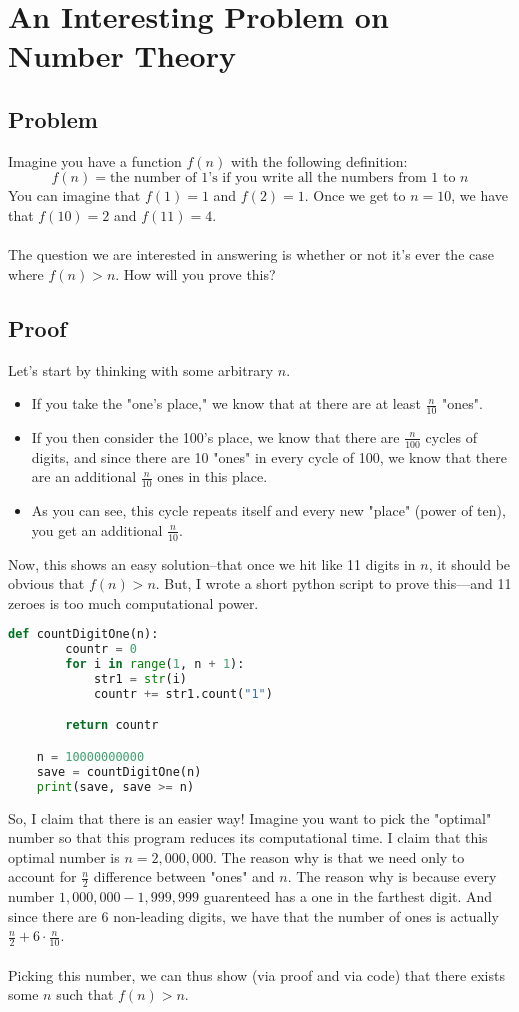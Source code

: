 \section{An Interesting Problem on Number Theory}
\subsection{Problem}

Imagine you have a function $f(n)$ with the following definition:
$$
f(n) = \text{the number of $1$'s if you write all the numbers from $1$ to $n$}
$$
You can imagine that $f(1) = 1$ and $f(2) = 1$. Once we get to $n = 10$, we have that $f(10) = 2$ and $f(11) = 4$. \\
\\
The question we are interested in answering is whether or not it's ever the case where $f(n) > n$. How will you prove this?

\subsection{Proof}
Let's start by thinking with some arbitrary $n$. 
\begin{itemize}
\item If you take the "one's place," we know that at there are at least $\frac{n}{10}$ "ones". 
\item If you then consider the 100's place, we know that there are $\frac{n}{100}$ cycles of digits, and since there are 10 "ones" in every cycle of 100, we know that there are an additional $\frac{n}{10}$ ones in this place.
\item As you can see, this cycle repeats itself and every new "place" (power of ten), you get an additional $\frac{n}{10}$. 
\end{itemize}
Now, this shows an easy solution--that once we hit like 11 digits in $n$, it should be obvious that $f(n) > n$. But, I wrote a short python script to prove this---and 11 zeroes is too much computational power. 

\begin{lstlisting}[language=Python]
	def countDigitOne(n):
		countr = 0
		for i in range(1, n + 1):
			str1 = str(i)
			countr += str1.count("1")

		return countr

	n = 10000000000
	save = countDigitOne(n)
	print(save, save >= n)
\end{lstlisting}

So, I claim that there is an easier way! Imagine you want to pick the "optimal" number so that this program reduces its computational time. I claim that this optimal number is $n = 2,000,000$. The reason why is that we need only to account for $\frac{n}{2}$ difference between "ones" and $n$. The reason why is because every number $1,000,000 - 1,999,999$ guarenteed has a one in the farthest digit. And since there are 6 non-leading digits, we have that the number of ones is actually $\frac{n}{2} + 6 \cdot \frac{n}{10}$.  \\
\\
Picking this number, we can thus show (via proof and via code) that there exists some $n$ such that $f(n) > n$.  